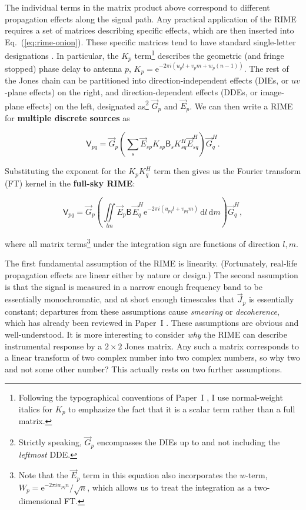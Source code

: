 \documentclass{aa}
\newcommand{\herm}{H}
\newcommand{\jones}[2]{\vec {#1}_{#2}}
\newcommand{\jonesT}[2]{\vec {#1}^{\herm}_{#2}}
\newcommand{\coh}[2]{\mathsf{{#1}}_{{#2}}}
\newcommand{\Exp}[1]{\mathrm{e}^{#1}}
\newcommand{\DD}[1]{\,\mathrm{d}{#1}}
\begin{document}
The individual terms in the matrix product above correspond to different propagation effects along the signal path. Any practical application of the RIME 
requires a set of matrices describing specific effects, which are then inserted into Eq.~(\ref{eq:rime-onion}). These specific matrices tend to have standard single-letter designations \citep[see e.g.][Sect.~7.3]{meqtrees}. In particular, the $K_p$ term\footnote{Following the typographical conventions of Paper~I \citep[][Sect.~1.4]{RRIME1}, I use normal-weight italics for $K_p$ to emphasize the fact that it is a scalar term rather than a full matrix.} describes the geometric (and fringe stopped) phase delay to antenna $p$,  $K_p = \Exp{-2\pi i(u_p l+v_p m+w_p (n-1))}.$ The rest of the Jones chain can be partitioned into direction-independent effects (DIEs, or $uv$-plane effects) on the right, and direction-dependent effects (DDEs, or image-plane effects) on the left, designated as\footnote{Strictly speaking, $\jones{G}{p}$ encompasses the DIEs up to and not including the \emph{leftmost} DDE.} $\jones{G}{p}$ and $\jones{E}{p}$. We can then write a RIME for {\bf multiple discrete sources} as

\begin{equation}
  \label{eq:rime-nps}
  \coh{V}{pq} = \jones{G}{p} \left ( \sum_{s}{\jones{E}{sp} K_{sp} \coh{B}{s} K^\herm_{sq} \jonesT{E}{sq}} \right ) \jonesT{G}{q}.
\end{equation}

Substituting the exponent for the $K_pK_q^\herm$ term then gives us the Fourier transform (FT) kernel in the {\bf full-sky RIME}:

\begin{equation}
  \label{eq:rime-fullsky}
  \coh{V}{pq} = \jones{G}{p} \left( \iint\limits_{lm} \jones{E}{p} \coh{B}{} \jonesT{E}{q} \Exp{-2\pi i(u_{pq} l+v_{pq} m)} \DD{l}\DD{m} \right ) \jonesT{G}{q},
\end{equation}

where all matrix terms\footnote{Note that the $\jones{E}{p}$ term in this equation also incorporates the $w$-term, $W_p=\Exp{-2\pi iw_{pq}n}/\sqrt{n}$,
which allows us to treat the integration as a two-dimensional FT.} under the integration sign are functions of direction $l,m$.

The first fundamental assumption of the RIME is linearity. (Fortunately, real-life propagation effects are linear either by nature or design.) The second assumption is that the signal is measured in a narrow enough frequency band to be essentially monochromatic, and at short enough timescales that $\jones{J}{p}$ is essentially constant; departures from these assumptions cause \emph{smearing} or \emph{decoherence}, which has already been reviewed in Paper~I \citep[][Sect.~5.2]{RRIME1}. These assumptions are obvious and well-understood. It is more interesting to consider \emph{why\/} the RIME can describe instrumental response by a $2\times2$ Jones matrix. Any such a matrix corresponds to a linear transform of two complex number into two complex numbers, so why two and not some other number? This actually rests on two further assumptions.
\end{document}
